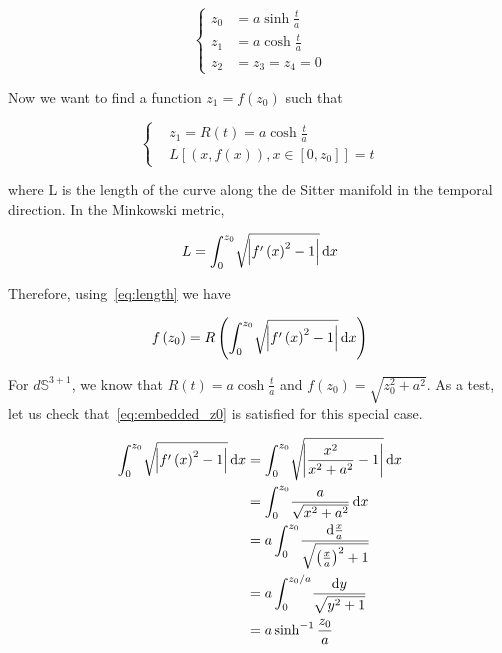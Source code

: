\documentclass[preprint,notitlepage,amsmath,amssymb,floatfix]{revtex4-1}
\begin{document}
\begin{equation}
\begin{cases}
z_0 &= a\sinh\frac{t}{a} \\
z_1 &= a\cosh\frac{t}{a} \\
z_2 &= z_3 = z_4 = 0
\end{cases}
\end{equation}

\noindent Now we want to find a function $z_1 = f\left(z_0\right)$ such that 

\begin{equation}
\label{eq:length}
\begin{cases}
&z_1 = R\left(t\right) = a\cosh\frac{t}{a} \\
&L\left[\left(x,f\left(x\right)\right), x\in\left[0,z_0\right]\right] = t
\end{cases}
\end{equation}

\noindent where L is the length of the curve along the de Sitter manifold in the temporal direction.  In the Minkowski metric,

\begin{equation}
L = \int_0^{z_0}\!\sqrt{\abs{f^\prime\left(x\right)^2 - 1}}\,\mathrm dx
\end{equation}

Therefore, using~\eqref{eq:length} we have

\begin{equation}
\label{eq:embedded_z0}
f\left(z_0\right) = R\left(\int_0^{z_0}\!\sqrt{\abs{f^\prime\left(x\right)^2-1}}\,\mathrm dx\right)
\end{equation}

For $d\mathbb{S}^{3+1}$, we know that $R\left(t\right) = a\cosh\frac{t}{a}$ and $f\left(z_0\right) = \sqrt{z_0^2+a^2}$.  As a test, let us check that~\eqref{eq:embedded_z0} is satisfied for this special case.

\begin{equation}
\begin{split}
\int_0^{z_0}\!\sqrt{\abs{f^\prime\left(x\right)^2-1}}\,\mathrm dx &= \int_0^{z_0}\!\sqrt{\abs{\frac{x^2}{x^2+a^2}-1}}\,\mathrm dx \\
&= \int_0^{z_0}\!\frac{a}{\sqrt{x^2+a^2}}\,\mathrm dx \\
&= a\int_0^{z_0}\!\frac{\mathrm d\frac{x}{a}}{\sqrt{\left(\frac{x}{a}\right)^2+1}} \\
&= a\int_0^{z_0/a}\!\frac{\mathrm dy}{\sqrt{y^2+1}} \\
&= a\sinh^{-1}\frac{z_0}{a}
\end{split}
\end{equation}
\end{document}

